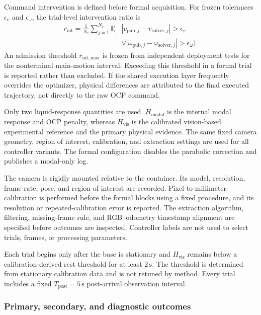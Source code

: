 Command intervention is defined before formal acquisition. For frozen
tolerances $\epsilon_v$ and $\epsilon_\omega$, the trial-level intervention
ratio is
\begin{equation}
\begin{aligned}
  r_{\mathrm{int}}
  =\frac{1}{N_c}\sum_{j=1}^{N_c}
  \mathbb I\!\big(&
  |v_{\mathrm{pub},j}-v_{\mathrm{solver},j}|>\epsilon_v\\[-1mm]
  &\lor
  |\omega_{\mathrm{pub},j}-\omega_{\mathrm{solver},j}|>\epsilon_\omega
  \big).
\end{aligned}
  \label{eq:intervention_ratio}
\end{equation}
An admission threshold $r_{\mathrm{int,max}}$ is frozen from independent
deployment tests for the nonterminal main-motion interval. Exceeding this
threshold in a formal trial is reported rather than excluded. If the shared
execution layer frequently overrides the optimizer, physical differences are
attributed to the final executed trajectory, not directly to the raw OCP
command.

Only two liquid-response quantities are used. $H_{\mathrm{modal}}$ is the
internal modal response and OCP penalty, whereas $H_{\mathrm{vis}}$ is the
calibrated vision-based experimental reference and the primary physical
evidence. The same fixed camera geometry, region of interest, calibration, and
extraction settings are used for all controller variants. The formal
configuration disables the parabolic correction and publishes a modal-only
log.

The camera is rigidly mounted relative to the container. Its model,
resolution, frame rate, pose, and region of interest are recorded.
Pixel-to-millimeter calibration is performed before the formal blocks using a
fixed procedure, and its resolution or repeated-calibration error is reported.
The extraction algorithm, filtering, missing-frame rule, and RGB--odometry
timestamp alignment are specified before outcomes are inspected. Controller
labels are not used to select trials, frames, or processing parameters.

Each trial begins only after the base is stationary and $H_{\mathrm{vis}}$
remains below a calibration-derived rest threshold for at least $2\,\mathrm{s}$.
The threshold is determined from stationary calibration data and is not
retuned by method. Every trial includes a fixed
$T_{\mathrm{post}}=5\,\mathrm{s}$ post-arrival observation interval.

\subsubsection{Primary, secondary, and diagnostic outcomes}

